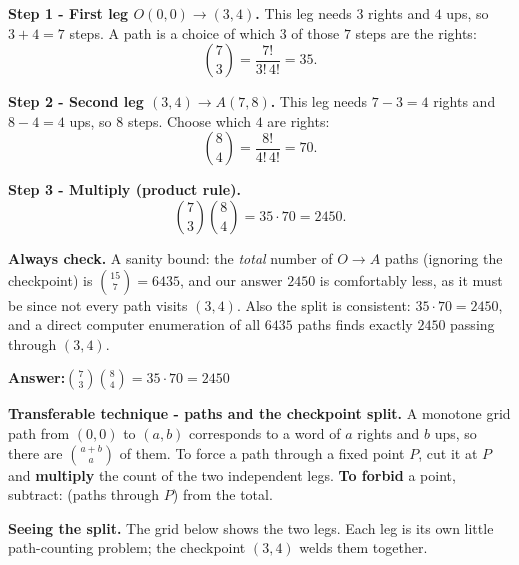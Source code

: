 \documentclass[11pt,a4paper]{article}
\newcommand{\answer}[1]{\begin{answerbox}\centering\textbf{Answer:}\quad #1\end{answerbox}}
\begin{document}
\textbf{Step 1 - First leg $O(0,0)\to(3,4)$.}
This leg needs $3$ rights and $4$ ups, so $3+4=7$ steps. A path is a choice of which $3$ of those
$7$ steps are the rights:
$$\binom{7}{3}=\frac{7!}{3!\,4!}=35.$$

\textbf{Step 2 - Second leg $(3,4)\to A(7,8)$.}
This leg needs $7-3=4$ rights and $8-4=4$ ups, so $8$ steps. Choose which $4$ are rights:
$$\binom{8}{4}=\frac{8!}{4!\,4!}=70.$$

\textbf{Step 3 - Multiply (product rule).}
$$\binom{7}{3}\binom{8}{4}=35\cdot 70=2450.$$

\textbf{Always check.} A sanity bound: the \emph{total} number of $O\to A$ paths (ignoring the
checkpoint) is $\binom{15}{7}=6435$, and our answer $2450$ is comfortably less, as it must be since
not every path visits $(3,4)$. Also the split is consistent: $35\cdot 70 = 2450$, and a direct
computer enumeration of all $6435$ paths finds exactly $2450$ passing through $(3,4)$.

\answer{$\displaystyle \binom{7}{3}\binom{8}{4}=35\cdot 70=2450$}

\begin{methodbox}
\textbf{Transferable technique - paths and the checkpoint split.} A monotone grid path from
$(0,0)$ to $(a,b)$ corresponds to a word of $a$ rights and $b$ ups, so there are $\binom{a+b}{a}$ of
them. To force a path through a fixed point $P$, cut it at $P$ and \textbf{multiply} the count of
the two independent legs. \textbf{To forbid} a point, subtract: (paths through $P$) from the total.
\end{methodbox}

\medskip
\textbf{Seeing the split.} The grid below shows the two legs. Each leg is its own little
path-counting problem; the checkpoint $(3,4)$ welds them together.

\begin{center}
\end{center}
\end{document}
